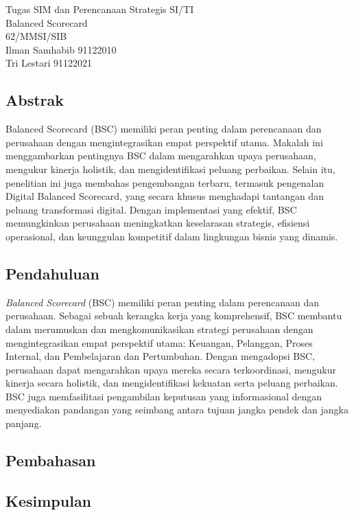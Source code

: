 \documentclass{article}
\title{}
\begin{document}
\begin{center}
    Tugas SIM dan Perencanaan Strategis SI/TI\\
    Balanced Scorecard\\
    62/MMSI/SIB\\
    Ilman Samhabib 91122010\\
    Tri Lestari 91122021\\	
\end{center}
\subsection*{Abstrak}

Balanced Scorecard (BSC) memiliki peran penting dalam perencanaan dan perusahaan dengan mengintegrasikan empat perspektif utama. Makalah ini menggambarkan pentingnya BSC dalam mengarahkan upaya perusahaan, mengukur kinerja holistik, dan mengidentifikasi peluang perbaikan. Selain itu, penelitian ini juga membahas pengembangan terbaru, termasuk pengenalan Digital Balanced Scorecard, yang secara khusus menghadapi tantangan dan peluang transformasi digital. Dengan implementasi yang efektif, BSC memungkinkan perusahaan meningkatkan keselarasan strategis, efisiensi operasional, dan keunggulan kompetitif dalam lingkungan bisnis yang dinamis.
\subsection*{Pendahuluan}
\emph{Balanced Scorecard} (BSC) memiliki peran penting dalam perencanaan dan perusahaan. Sebagai sebuah kerangka kerja yang komprehensif, BSC membantu dalam merumuskan dan mengkomunikasikan strategi perusahaan dengan mengintegrasikan empat perspektif utama: Keuangan, Pelanggan, Proses Internal, dan Pembelajaran dan Pertumbuhan. Dengan mengadopsi BSC, perusahaan dapat mengarahkan upaya mereka secara terkoordinasi, mengukur kinerja secara holistik, dan mengidentifikasi kekuatan serta peluang perbaikan. BSC juga memfasilitasi pengambilan keputusan yang informasional dengan menyediakan pandangan yang seimbang antara tujuan jangka pendek dan jangka panjang. 
\subsection*{Pembahasan}
\subsection*{Kesimpulan}


% 
% 
\end{document}
